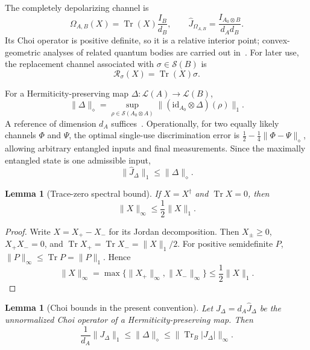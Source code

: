 \documentclass[11pt,a4paper]{article}
\theoremstyle{definition}
\theoremstyle{plain}
\newtheorem{lemma}[theorem]{Lemma}
\theoremstyle{remark}
\DeclareMathOperator{\Tr}{Tr}
\newcommand{\Lin}{\mathcal L}
\newcommand{\Sstate}{\mathcal{S}}
\newcommand{\id}{\mathrm{id}}
\begin{document}
The completely depolarizing channel is
\[
\Omega_{A,B}(X)=\Tr(X)\frac{I_B}{d_B},
\qquad
\widehat J_{\Omega_{A,B}}
=\frac{I_{A_0\otimes B}}{d_Ad_B}.
\]
Its Choi operator is positive definite, so it is a relative interior point; convex-geometric analyses of related quantum bodies are carried out in~\cite{SzarekBengtssonZyczkowski2006}.
For later use, the replacement channel associated with
$\sigma\in\Sstate(B)$ is
\[
\mathcal R_\sigma(X)=\Tr(X)\sigma.
\]

For a Hermiticity-preserving map
$\Delta:\Lin(A)\to\Lin(B)$,
\[
\|\Delta\|_\diamond
=
\sup_{\rho\in\Sstate(A_0\otimes A)}
\|(\id_{A_0}\otimes\Delta)(\rho)\|_1.
\]
A reference of dimension $d_A$ suffices~\cite{Watrous2018}. Operationally,
for two equally likely channels $\Phi$ and $\Psi$, the optimal single-use
discrimination error is
$\tfrac12-\tfrac14\|\Phi-\Psi\|_\diamond$, allowing arbitrary entangled
inputs and final measurements. Since the maximally entangled state is one
admissible input,
\begin{equation}
\label{eq:choi-diamond}
\|\widehat J_\Delta\|_1\leq\|\Delta\|_\diamond.
\end{equation}

\begin{lemma}[Trace-zero spectral bound]
\label{lem:trace-zero}
If $X=X^\dagger$ and $\Tr X=0$, then
\[
\|X\|_\infty\leq\frac12\|X\|_1.
\]
\end{lemma}

\begin{proof}
Write $X=X_+-X_-$ for its Jordan decomposition. Then
$X_\pm\geq0$, $X_+X_-=0$, and
$\Tr X_+=\Tr X_-=\|X\|_1/2$. For positive semidefinite $P$,
$\|P\|_\infty\leq\Tr P=\|P\|_1$. Hence
\[
\|X\|_\infty
=\max\{\|X_+\|_\infty,\|X_-\|_\infty\}
\leq\frac12\|X\|_1.
\]
\end{proof}

\begin{lemma}[Choi bounds in the present convention]
\label{lem:choi-upper}
Let $J_\Delta=d_A\widehat J_\Delta$ be the unnormalized Choi operator of
a Hermiticity-preserving map. Then
\[
\frac1{d_A}\|J_\Delta\|_1
\leq\|\Delta\|_\diamond
\leq\|\Tr_B|J_\Delta|\|_\infty.
\]
\end{lemma}
\end{document}
